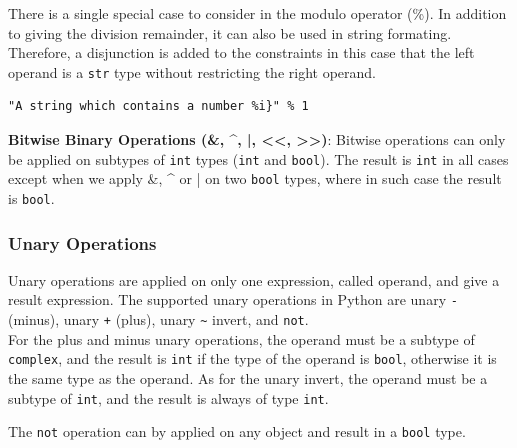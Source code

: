 There is a single special case to consider in the modulo operator (\%). In addition to giving the division remainder, it can also be used in string formating. Therefore, a disjunction is added to the constraints in this case that the left operand is a \lstinline|str| type without restricting the right operand.

\begin{lstlisting}
"A string which contains a number %i}" % 1
\end{lstlisting}

\textbf{Bitwise Binary Operations (\&, \textrm{\^}, |, <<, >>)}:
Bitwise operations can only be applied on subtypes of \lstinline|int| types (\lstinline|int| and \lstinline|bool|). The result is \lstinline|int| in all cases except when we apply \&, \textrm{\^} or | on two \lstinline|bool| types, where in such case the result is \lstinline|bool|.

\subsubsection{Unary Operations}
Unary operations are applied on only one expression, called operand, and give a result expression. The supported unary operations in Python are unary \lstinline|-| (minus), unary \lstinline|+| (plus), unary \lstinline|~| invert, and \lstinline|not|.\\

For the plus and minus unary operations, the operand must be a subtype of \lstinline|complex|, and the result is \lstinline|int| if the type of the operand is \lstinline|bool|, otherwise it is the same type as the operand. As for the unary invert, the operand must be a subtype of \lstinline|int|, and the result is always of type \lstinline|int|.

The \lstinline|not| operation can by applied on any object and result in a \lstinline|bool| type.


